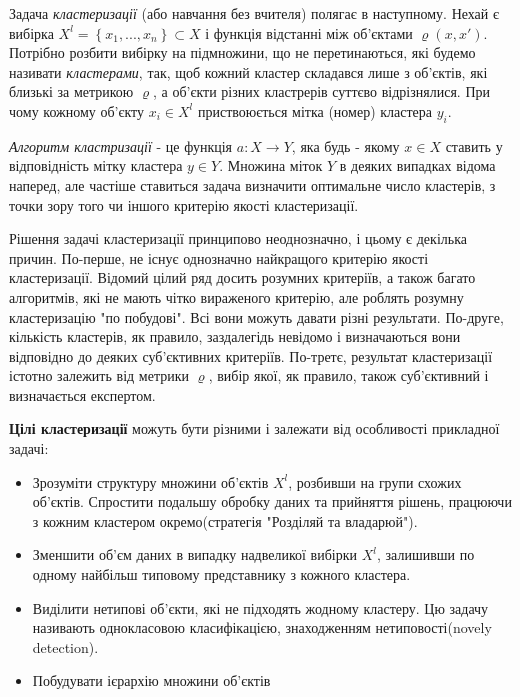 \documentclass[a4paper,14pt,russian]{extreport}
\begin{document}
Задача \textit{кластеризації} (або навчання без вчителя) полягає в наступному. Нехай є вибірка  $ X^{l}  = \left \{ x_1, ..., x_n \right \} \subset X$  і функція відстанні між об'єктами $ \varrho \left(x, x' \right) $. Потрібно розбити вибірку на підмножини, що не перетинаються, які будемо називати \textit{кластерами}, так, щоб кожний кластер складався лише з об'єктів, які близькі за метрикою  $ \varrho $, а об'єкти різних кластрерів суттєво відрізнялися.  При чому кожному об'єкту $ x_i \in X^{l}  $ приствоюється мітка (номер) кластера $ y_i $. \cite{voron} \par
	\textit{Алгоритм кластризації} - це функція $ a : X \to Y $, яка будь - якому $ x \in X $ ставить у відповідність мітку кластера $ y \in Y $. Множина міток $ Y $ в деяких випадках відома наперед, але частіше ставиться задача визначити оптимальне число кластерів, з точки зору того чи іншого критерію якості кластеризації. \cite{voron} \par
	Рішення задачі кластеризації принципово неоднозначно, і цьому є
декілька причин. По-перше, не існує однозначно найкращого критерію якості кластеризації. Відомий цілий ряд досить розумних критеріїв, а також
багато алгоритмів, які не мають чітко вираженого критерію, але роблять
розумну кластеризацію "по побудові". Всі вони можуть давати різні результати. По-друге, кількість кластерів, як правило,  заздалегідь невідомо і визначаються вони відповідно до деяких суб'єктивних критеріїв. По-третє, результат кластеризації істотно залежить від метрики
$ \varrho $, вибір якої, як правило,
також суб'єктивний і визначається експертом. \par 
	\textbf{Цілі кластеризації} можуть бути різними і залежати від особливості прикладної задачі:
	\begin{itemize}

		\item Зрозуміти структуру множини об'єктів $ X^{l} $,  розбивши на групи схожих об'єктів. Спростити подальшу обробку даних та прийняття рішень, працюючи з кожним кластером окремо(стратегія "Розділяй та владарюй").
		
		\item Зменшити об'єм даних в випадку надвеликої вибірки $ X^{l} $, залишивши по одному найбільш типовому представнику з кожного кластера.
		
		\item Виділити нетипові об'єкти, які не підходять жодному кластеру. Цю задачу називають однокласовою класифікацією, знаходженням нетиповості(novely detection).
		
		\item Побудувати ієрархію множини об'єктів
		

	\end{itemize}
\end{document}
